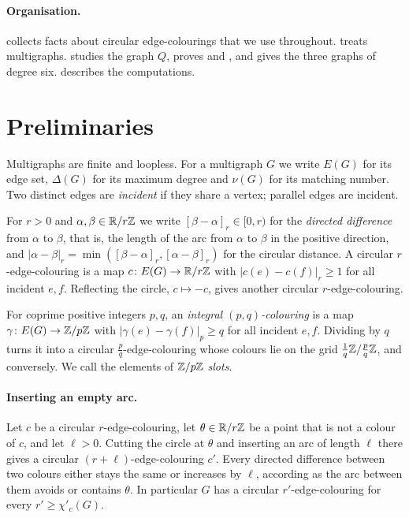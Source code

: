 \documentclass[11pt,colorlinks]{charlie}
\newcommand{\cind}{\chi'_c}
\newcommand{\dir}[2]{[#2-#1]}
\begin{document}
\paragraph{Organisation.}
 collects facts about circular edge-colourings that we use throughout.  treats multigraphs.  studies the graph $Q$,  proves  and , and  gives the three graphs of degree six.  describes the computations.

\section{Preliminaries}\label{sec:prelim}

Multigraphs are finite and loopless. For a multigraph $G$ we write $E(G)$ for its edge set, $\Delta(G)$ for its maximum degree and $\nu(G)$ for its matching number. Two distinct edges are \emph{incident} if they share a vertex; parallel edges are incident.

For $r>0$ and $\alpha,\beta\in\mathbb{R}/r\mathbb{Z}$ we write $\dir\alpha\beta_r\in[0,r)$ for the \emph{directed difference} from $\alpha$ to $\beta$, that is, the length of the arc from $\alpha$ to $\beta$ in the positive direction, and $|\alpha-\beta|_r=\min(\dir\alpha\beta_r,\dir\beta\alpha_r)$ for the circular distance. A circular $r$-edge-colouring is a map $c\colon E(G)\to\mathbb{R}/r\mathbb{Z}$ with $|c(e)-c(f)|_r\ge1$ for all incident $e,f$. Reflecting the circle, $c\mapsto-c$, gives another circular $r$-edge-colouring.

For coprime positive integers $p,q$, an \emph{integral $(p,q)$-colouring} is a map $\gamma\colon E(G)\to\mathbb{Z}/p\mathbb{Z}$ with $|\gamma(e)-\gamma(f)|_p\ge q$ for all incident $e,f$. Dividing by $q$ turns it into a circular $\frac pq$-edge-colouring whose colours lie on the grid $\frac1q\mathbb{Z}/\frac pq\mathbb{Z}$, and conversely. We call the elements of $\mathbb{Z}/p\mathbb{Z}$ \emph{slots}.

\paragraph{Inserting an empty arc.}
Let $c$ be a circular $r$-edge-colouring, let $\theta\in\mathbb{R}/r\mathbb{Z}$ be a point that is not a colour of $c$, and let $\ell>0$. Cutting the circle at $\theta$ and inserting an arc of length $\ell$ there gives a circular $(r+\ell)$-edge-colouring $c'$. Every directed difference between two colours either stays the same or increases by $\ell$, according as the arc between them avoids or contains $\theta$. In particular $G$ has a circular $r'$-edge-colouring for every $r'\ge\cind(G)$.
\end{document}

